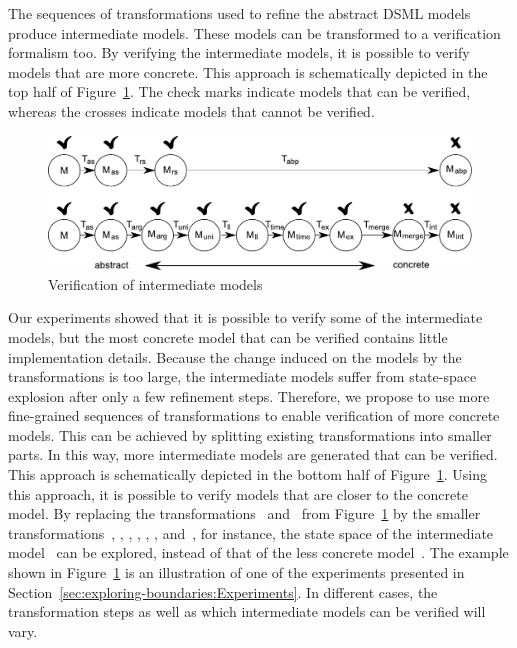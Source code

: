 The sequences of transformations used to refine the abstract DSML models produce intermediate models.
These models can be transformed to a verification formalism too.
By verifying the intermediate models, it is possible to verify models that are more concrete.
This approach is schematically depicted in the top half of Figure~\ref{fig:exploring-boundaries:mc_approach}.
The check marks indicate models that can be verified, whereas the crosses indicate models that cannot be verified.
\begin{figure}[hbt]
 \centering
 \includegraphics[width=.7\columnwidth]{exploring-boundaries/figs/fine-grained-transformations}
 \caption{Verification of intermediate models}
 \label{fig:exploring-boundaries:mc_approach}
\end{figure}
Our experiments showed that it is possible to verify some of the intermediate models, but the most concrete model that can be verified contains little implementation details.
Because the change induced on the models by the transformations is too large, the intermediate models suffer from state-space explosion after only a few refinement steps.
Therefore, we propose to use more fine-grained sequences of transformations to enable verification of more concrete models.
This can be achieved by splitting existing transformations into smaller parts.
In this way, more intermediate models are generated that can be verified.
This approach is schematically depicted in the bottom half of Figure~\ref{fig:exploring-boundaries:mc_approach}.
Using this approach, it is possible to verify models that are closer to the concrete model.
By replacing the transformations~ and~ from Figure~\ref{fig:exploring-boundaries:mc_approach} by the smaller transformations~, , , , , , and~, for instance, the state space of the intermediate model~ can be explored, instead of that of the less concrete model~.
The example shown in Figure~\ref{fig:exploring-boundaries:mc_approach} is an illustration of one of the experiments presented in Section~\ref{sec:exploring-boundaries:Experiments}.
In different cases, the transformation steps as well as which intermediate models can be verified will vary.

